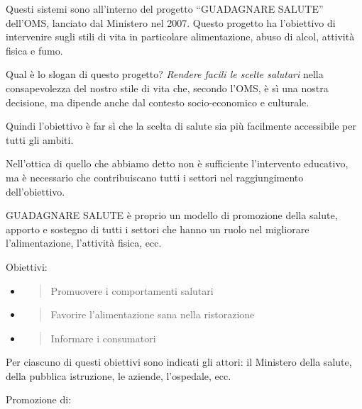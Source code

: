 \documentclass[]{article}
\begin{document}
Questi sistemi sono all'interno del progetto ``GUADAGNARE SALUTE''
dell'OMS, lanciato dal Ministero nel 2007. Questo progetto ha
l'obiettivo di intervenire sugli stili di vita in particolare
alimentazione, abuso di alcol, attività fisica e fumo.

Qual è lo slogan di questo progetto? \emph{Rendere facili le scelte
salutari} nella consapevolezza del nostro stile di vita che, secondo
l'OMS, è sì una nostra decisione, ma dipende anche dal contesto
socio-economico e culturale.

Quindi l'obiettivo è far sì che la scelta di salute sia più facilmente
accessibile per tutti gli ambiti.

Nell'ottica di quello che abbiamo detto non è sufficiente l'intervento
educativo, ma è necessario che contribuiscano tutti i settori nel
raggiungimento dell'obiettivo.

GUADAGNARE SALUTE è proprio un modello di promozione della salute,
apporto e sostegno di tutti i settori che hanno un ruolo nel migliorare
l'alimentazione, l'attività fisica, ecc.

Obiettivi:

\begin{itemize}
\item
  \begin{quote}
  Promuovere i comportamenti salutari
  \end{quote}
\item
  \begin{quote}
  Favorire l'alimentazione sana nella ristorazione
  \end{quote}
\item
  \begin{quote}
  Informare i consumatori
  \end{quote}
\end{itemize}

Per ciascuno di questi obiettivi sono indicati gli attori: il Ministero
della salute, della pubblica istruzione, le aziende, l'ospedale, ecc.

Promozione di:
\end{document}
